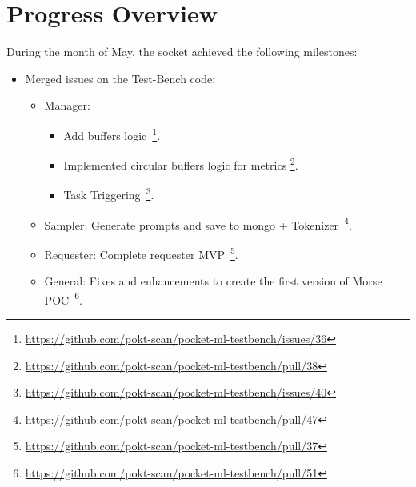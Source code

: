 \section{Progress Overview}\label{sec:a}

During the month of May, the socket achieved the following milestones:

\begin{itemize}\setlength\itemsep{2mm}
    \item Merged issues on the Test-Bench code:
    \begin{itemize}
        \item Manager:
            \begin{itemize}
                \item Add buffers logic~\footnote{\url{https://github.com/pokt-scan/pocket-ml-testbench/issues/36}}.
                \item Implemented circular buffers logic for metrics \footnote{\url{https://github.com/pokt-scan/pocket-ml-testbench/pull/38}}.
                \item Task Triggering~\footnote{\url{https://github.com/pokt-scan/pocket-ml-testbench/issues/40}}.
            \end{itemize}
        \item Sampler: Generate prompts and save to mongo + Tokenizer~\footnote{\url{https://github.com/pokt-scan/pocket-ml-testbench/pull/47}}.
        \item Requester: Complete requester MVP~\footnote{\url{https://github.com/pokt-scan/pocket-ml-testbench/pull/37}}.
        \item General: Fixes and enhancements to create the first version of Morse POC~\footnote{\url{https://github.com/pokt-scan/pocket-ml-testbench/pull/51}}.
    \end{itemize}
\end{itemize}